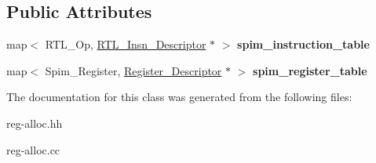 \subsection*{Public Attributes}
\begin{DoxyCompactItemize}
\item 
\mbox{\label{classMachine__Description_aa122bf738407bb2b3fea850e2cd00fc4}} 
map$<$ R\+T\+L\+\_\+\+Op, \hyperlink{classRTL__Insn__Descriptor}{R\+T\+L\+\_\+\+Insn\+\_\+\+Descriptor} $\ast$ $>$ {\bfseries spim\+\_\+instruction\+\_\+table}
\item 
\mbox{\label{classMachine__Description_a20b86b8722fdeb33d51055f8a3f81ac9}} 
map$<$ Spim\+\_\+\+Register, \hyperlink{classRegister__Descriptor}{Register\+\_\+\+Descriptor} $\ast$ $>$ {\bfseries spim\+\_\+register\+\_\+table}
\end{DoxyCompactItemize}


The documentation for this class was generated from the following files\+:\begin{DoxyCompactItemize}
\item 
reg-\/alloc.\+hh\item 
reg-\/alloc.\+cc\end{DoxyCompactItemize}

